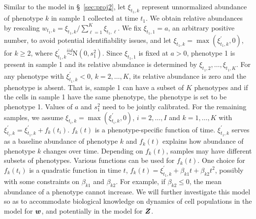 \documentclass[12pt,]{article}
\newcommand{\N}{ \mathcal{N} }
\newcommand{\iid}{\overset{iid}{\sim}}
\def\N{\text{N}}
\newcommand{\bZ}{\mbox{\boldmath $Z$}}
\newcommand{\bw}{\mbox{\boldmath $w$}}
\begin{document}
Similar to the model in \S~\ref{sec:proj2}, let $\xi_{t_1,k}$ represent
unnormalized abundance of phenotype $k$ in sample 1 collected at time $t_1$.
We obtain relative abundances by rescaling $w_{t_1,k}=
\xi_{t_1,k}/\sum_{\ell=1}^K \xi_{t_1, \ell}$.  We fix $\xi_{t_1,1}=a$, an
arbitrary positive number, to avoid potential identifiability issues, and let
$\xi_{t_1,k} = \max(\xi^\prime_{t_1,k}, 0)$, for $k\ge 2$, where
$\xi^\prime_{t_1,k} \iid \N(0, s^2_1)$.  Since $\xi_{t_1, 1}$ is fixed at
$a>0$, phenotype 1 is present in sample 1 and its relative abundance is
determined by $\xi_{t_1, 2}, \ldots, \xi_{t_1, K}$.  For any phenotype with
$\xi^\prime_{t_1, k} < 0$, $k=2, \ldots, K$, its relative abundance is zero and
the phenotype is absent.  That is, sample 1 can have a subset of $K$ phenotypes
and if the cells in sample 1 have the same phenotype, the phenotype is set to be
phenotype 1. Values of $a$ and $s^2_1$ need to be jointly calibrated. For the
remaining samples, we assume $\xi_{t_i,k} = \max(\xi^\prime_{t_i,k}, 0)$, $i=2,
\ldots, I$ and $k=1, \ldots, K$ with $\xi^\prime_{t_i,k} = \xi^\prime_{t_1, k}
+ f_k(t_i)$. $f_k(t)$ is a phenotype-specific function of time.
$\xi^\prime_{t_1, k}$ serves as a baseline abundance of phenotype $k$ and
$f_k(t)$ explains how abundance of phenotype $k$ changes over time.
Depending on $f_k(t)$, samples may have different subsets of phenotypes.
Various functions can be used for $f_k(t)$.  One choice for $f_k(t_i)$ is a
quadratic function in time $t$, $f_k(t) = \xi^\prime_{t_1,k} + \beta_{k1}t +
\beta_{k2}t^2$, possibly with some constraints on $\beta_{k1}$ and
$\beta_{k2}.$  For example, if $\beta_{k2} \leq 0$, the mean abundance of a
phenotype cannot increase.  We will further investigate this model so as to
accommodate biological knowledge on dynamics of cell populations in the model
for $\bw$, and potentially in the model for $\bZ$.   

\end{document}
